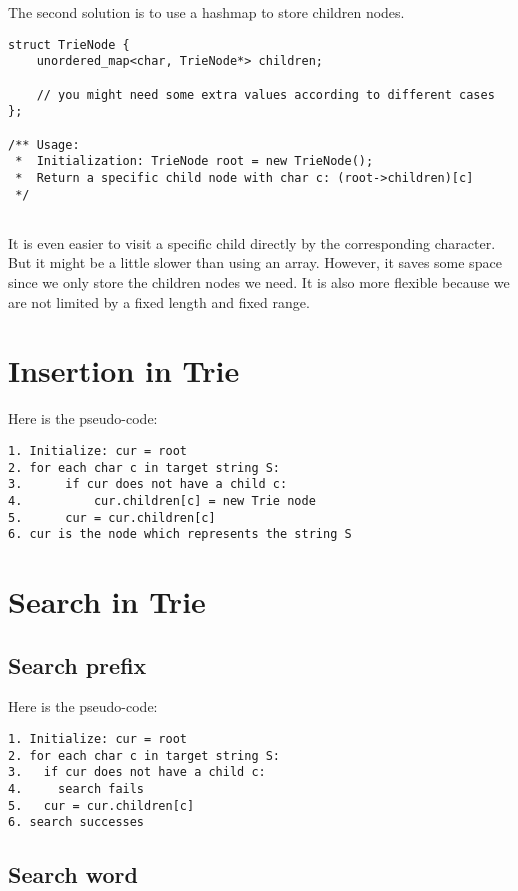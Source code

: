 The second solution is to use a hashmap to store children nodes.

\begin{lstlisting}
struct TrieNode {
    unordered_map<char, TrieNode*> children;
    
    // you might need some extra values according to different cases
};

/** Usage:
 *  Initialization: TrieNode root = new TrieNode();
 *  Return a specific child node with char c: (root->children)[c]
 */
  
\end{lstlisting}

It is even easier to visit a specific child directly by the corresponding character. But it might be a little slower than using an array. However, it saves some space since we only store the children nodes we need. It is also more flexible because we are not limited by a fixed length and fixed range.

\section{Insertion in Trie}


Here is the pseudo-code:
\begin{lstlisting}
1. Initialize: cur = root
2. for each char c in target string S:
3.      if cur does not have a child c:
4.          cur.children[c] = new Trie node
5.      cur = cur.children[c]
6. cur is the node which represents the string S  
\end{lstlisting}



\section{Search in Trie}

\subsection{Search prefix}

Here is the pseudo-code:
\begin{lstlisting}
1. Initialize: cur = root
2. for each char c in target string S:
3.   if cur does not have a child c:
4.     search fails
5.   cur = cur.children[c]
6. search successes  
\end{lstlisting}


\subsection{Search word}


